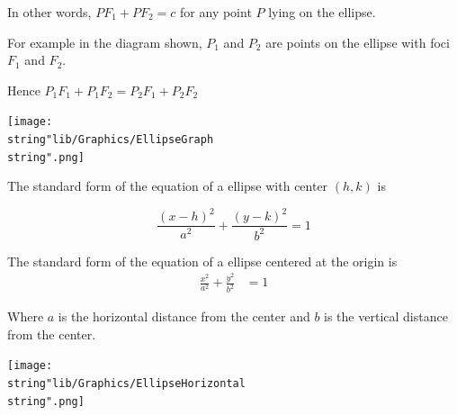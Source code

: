 \documentclass[11pt,a4paper]{book}
\begin{document}
In other words, $PF_{1}+PF_{2}=c$ for any point $P$ lying on the
ellipse.

\begin{minipage}[t]{0.5\textwidth}

For example in the diagram shown, $P_{1}$ and $P_{2}$ are points
on the ellipse with foci $F_{1}$ and $F_{2}$.

Hence $P_{1}F_{1}+P_{1}F_{2}=P_{2}F_{1}+P_{2}F_{2}$

\end{minipage}
\begin{minipage}{0.5\textwidth}
\begin{center}
\texttt{[image: \\string"lib/Graphics/EllipseGraph\\string".png]}
\par\end{center}

\end{minipage}

\newpage

\begin{tcolorbox}[colback=blue!5, colframe=black,boxrule=.4pt, sharpish corners]

The standard form of the equation of a ellipse with center $\left(h,k\right)$
is

\[
\frac{\left(x-h\right)^{2}}{a^{2}}+\frac{\left(y-k\right)^{2}}{b^{2}}=1
\]

The standard form of the equation of a ellipse centered at the origin
is
\begin{align*}
\frac{x^{2}}{a^{2}}+\frac{y^{2}}{b^{2}} & =1
\end{align*}

Where $a$ is the horizontal distance from the center and $b$ is
the vertical distance from the center.

\end{tcolorbox}

\begin{center}
\texttt{[image: \\string"lib/Graphics/EllipseHorizontal\\string".png]}
\par\end{center}
\end{document}
